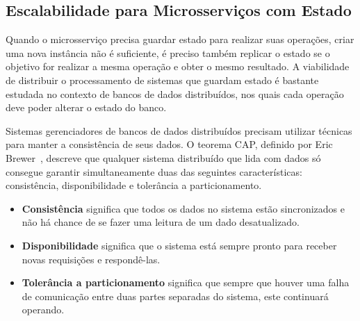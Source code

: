 



 



\subsection{Escalabilidade para Microsserviços com Estado}
\label{sec:stateful}

 
Quando o microsserviço precisa guardar estado para realizar suas operações, criar uma nova instância não é suficiente, é preciso também replicar o estado se o objetivo for realizar a mesma operação e obter o mesmo resultado. A viabilidade de distribuir o processamento de sistemas que guardam estado é bastante estudada no contexto de bancos de dados distribuídos, nos quais cada operação deve poder alterar o estado do banco.

Sistemas gerenciadores de bancos de dados distribuídos precisam utilizar técnicas para manter a consistência de seus dados. O teorema CAP, definido por Eric Brewer~\citep{Gilbert:2002:BCF:564585.564601}, descreve que qualquer sistema distribuído 
que lida com dados só consegue garantir simultaneamente duas das seguintes características: consistência, disponibilidade e tolerância a particionamento.%
\begin{itemize}
\item \textbf{Consistência} significa que todos os dados no sistema estão sincronizados e não há chance de se fazer uma leitura de um dado desatualizado. 
\item \textbf{Disponibilidade} significa que o sistema está sempre pronto para receber novas requisições e respondê-las. 
\item \textbf{Tolerância a particionamento} significa que sempre que houver uma falha de comunicação entre duas partes separadas do sistema, este continuará operando. 
\end{itemize}

